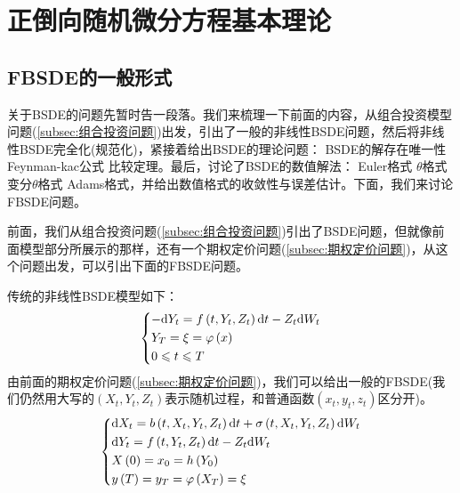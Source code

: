\section{正倒向随机微分方程基本理论}
	\subsection{FBSDE的一般形式}
		\par
		 关于BSDE的问题先暂时告一段落。我们来梳理一下前面的内容，从组合投资模型问题(\ref{subsec:组合投资问题})出发，引出了一般的非线性BSDE问题，然后将非线性BSDE完全化(规范化)，紧接着给出BSDE的理论问题：
		  BSDE的解存在唯一性 Feynman-kac公式 比较定理。最后，讨论了BSDE的数值解法：  Euler格式 $\theta$格式 变分$\theta$格式  Adams格式，并给出数值格式的收敛性与误差估计。下面，我们来讨论FBSDE问题。
		\par
		前面，我们从组合投资问题(\ref{subsec:组合投资问题})引出了BSDE问题，但就像前面模型部分所展示的那样，还有一个期权定价问题(\ref{subsec:期权定价问题})，从这个问题出发，可以引出下面的FBSDE问题。
		\par
		传统的非线性BSDE模型如下：
				\begin{equation*}
				\centering
				\left\{\begin{lgathered}
				{ - \mathrm{d}{Y_t} = f\left( {t,{Y_t},{Z_t}} \right)\mathrm{d}t - {Z_t}\mathrm{d}{W_t}}\\
				{Y_T} = \xi  = \varphi \left( x \right)\\
				0 \leqslant t \leqslant T
				\end{lgathered} \right.
				\end{equation*}
		由前面的期权定价问题(\ref{subsec:期权定价问题})，我们可以给出一般的FBSDE(我们仍然用大写的$(X_t,Y_t,Z_t)$表示随机过程，和普通函数$(x_t,y_t,z_t)$区分开)。
				\begin{equation*}
				\centering
				\left\{\begin{lgathered}
				\mathrm{d}{X_t} = b\left( {t,{X_t},{Y_t},{Z_t}} \right)\mathrm{d}t + \sigma \left( {t,{X_t},{Y_t},{Z_t}} \right)\mathrm{d}{W_t}\\
				\mathrm{d}{Y_t} = f\left( {t,{Y_t},{Z_t}} \right)\mathrm{d}t - {Z_t}\mathrm{d}{W_t}\\
				X\left( 0 \right) = {x_0} = h\left( {{Y_0}} \right)\\
				y\left( T \right) = {y_T} = \varphi \left( {{X_T}} \right) = \xi
				\end{lgathered} \right.
				\end{equation*}
